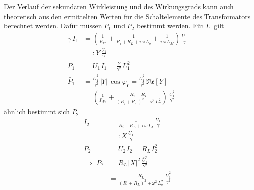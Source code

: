 \documentclass[a4paper, 12pt,]{scrartcl}
\begin{document}
Der Verlauf der sekundären Wirkleistung und des Wirkungsgrads kann auch theoretisch aus den ermittelten Werten für die Schaltelemente des Transformators berechnet werden. Dafür müssen $\bar{P}_1$ und $\bar{P}_2$ bestimmt werden. Für $I_1$ gilt
\begin{align*}\gamma\,I_1&=\left(\frac{1}{R_{Fe}}+\frac{1}{R_i+R_L+i\,\omega\,L_\sigma}+\frac{1}{i\,\omega\,L_M}\right)\,\frac{U_1}{\gamma}\\
&=:Y\,\frac{U_1}{\gamma}\\
P_1&=U_1\,I_1=\frac{Y}{\gamma^2}\,U_1^2\\
\bar{P}_1&=\frac{\bar{U}_1^2}{\gamma^2}\,|Y|\,\cos\varphi_Y=\frac{\bar{U}_1^2}{\gamma^2}\,\mathfrak{Re}[Y]\\
&=\left(\frac{1}{R_{Fe}}+\frac{R_i+R_L}{(R_i+R_L)^2+\omega^2\,L_\sigma^2}\right)\,\frac{\bar{U}_1^2}{\gamma^2}\end{align*}
ähnlich bestimmt sich $\bar{P}_2$
\begin{align*}
I_2&=\frac{1}{R_i+R_L+i\,\omega\,L_\sigma}\,\frac{U_1}{\gamma}\\
&=:X\,\frac{U_1}{\gamma}\\
P_2&=U_2\,I_2=R_L\,I_2^2\\
\Rightarrow\;\bar{P}_2&=R_L\,|X|^2\,\frac{\bar{U}_1^2}{\gamma^2}\\
&=\frac{R_L}{(R_i+R_L)^2+\omega^2\,L_\sigma^2}\,\frac{\bar{U}_1^2}{\gamma^2}
\end{align*}
\end{document}
